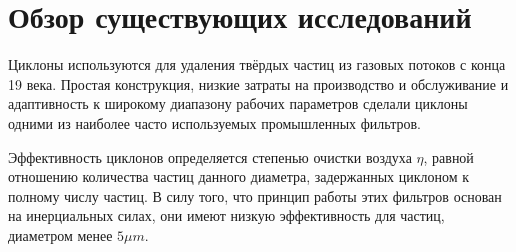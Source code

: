 \section{Обзор существующих исследований}
	Циклоны используются для удаления твёрдых частиц из газовых потоков с конца 19 века. Простая конструкция, низкие затраты на производство и обслуживание и адаптивность к широкому диапазону рабочих параметров сделали циклоны одними из наиболее часто используемых промышленных фильтров. 
	
		Эффективность циклонов определяется степенью очистки воздуха $\eta$, равной отношению количества частиц данного диаметра, задержанных циклоном к полному числу частиц. В силу того, что принцип работы этих фильтров основан на инерциальных силах, они имеют низкую эффективность для частиц, диаметром менее $5 \mu m$.
	
